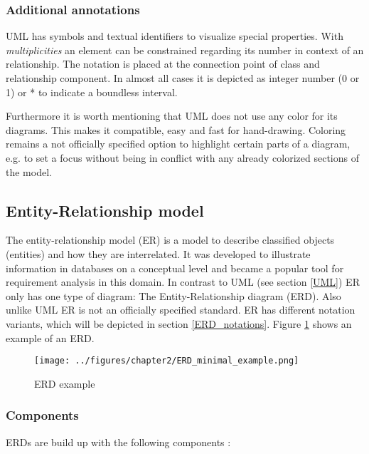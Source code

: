 \documentclass[twoside, openright, 12pt]{book}
\begin{document}
\subsubsection{Additional annotations}
\label{UML_additional_annotations}
UML has symbols and textual identifiers to visualize special properties.
With \textit{multiplicities} an element can be constrained regarding its number in context of an relationship.
The notation is placed at the connection point of class and relationship component.
In almost all cases it is depicted as integer number (0 or 1) or * to indicate a boundless interval.

Furthermore it is worth mentioning that UML does not use any color for its diagrams.
This makes it compatible, easy and fast for hand-drawing.
Coloring remains a not officially specified option to highlight certain parts of a diagram, e.g. to set a focus without being in conflict with any already colorized sections of the model.


\subsection{Entity-Relationship model}
\label{ER}
The entity-relationship model (ER) is a model to describe classified objects (entities) and how they are interrelated.
It was developed to illustrate information in databases on a conceptual level and became a popular tool for requirement analysis in this domain.
In contrast to UML (see section \ref{UML}) ER only has one type of diagram: The Entity-Relationship diagram (ERD).
Also unlike UML ER is not an officially specified standard.
ER has different notation variants, which will be depicted in section \ref{ERD_notations}.
Figure \ref{fig:ERD_minimal_example} shows an example of an ERD.

\vspace{4mm}
\begin{figure}[htb]
	\centering
	\texttt{[image: ../figures/chapter2/ERD\_minimal\_example.png]}
	\caption{ERD example}
	\label{fig:ERD_minimal_example}
\end{figure}

\subsubsection{Components}
ERDs are build up with the following components \citep{Kleuker11}:
\end{document}
